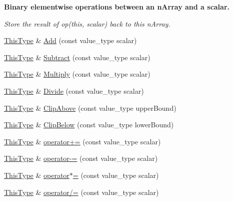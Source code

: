 \begin{Indent}{\bf Binary elementwise operations between an n\+Array and a scalar.}\par
{\em Store the result of op(this, scalar) back to this n\+Array. }\begin{DoxyCompactItemize}
\item 
\hyperlink{classvct_dynamic_const_n_array_base_a5123caffcf1455a1b99003877eade897}{This\+Type} \& \hyperlink{classvct_dynamic_n_array_base_af88d5b7c31a1d437dace088efb4a4381}{Add} (const value\+\_\+type scalar)
\item 
\hyperlink{classvct_dynamic_const_n_array_base_a5123caffcf1455a1b99003877eade897}{This\+Type} \& \hyperlink{classvct_dynamic_n_array_base_a6a5cf6ded7976f6d4fce24d6bea84232}{Subtract} (const value\+\_\+type scalar)
\item 
\hyperlink{classvct_dynamic_const_n_array_base_a5123caffcf1455a1b99003877eade897}{This\+Type} \& \hyperlink{classvct_dynamic_n_array_base_ac2cd87a03de241ea4dbc4047c84ec6b1}{Multiply} (const value\+\_\+type scalar)
\item 
\hyperlink{classvct_dynamic_const_n_array_base_a5123caffcf1455a1b99003877eade897}{This\+Type} \& \hyperlink{classvct_dynamic_n_array_base_a51a40fd2c5e4e979de62eb4dbbd3132e}{Divide} (const value\+\_\+type scalar)
\item 
\hyperlink{classvct_dynamic_const_n_array_base_a5123caffcf1455a1b99003877eade897}{This\+Type} \& \hyperlink{classvct_dynamic_n_array_base_ae0dea278c57e2543df8e7f25c8a2f3b7}{Clip\+Above} (const value\+\_\+type upper\+Bound)
\item 
\hyperlink{classvct_dynamic_const_n_array_base_a5123caffcf1455a1b99003877eade897}{This\+Type} \& \hyperlink{classvct_dynamic_n_array_base_aecd4a372764187d5eb95809c9b13082f}{Clip\+Below} (const value\+\_\+type lower\+Bound)
\item 
\hyperlink{classvct_dynamic_const_n_array_base_a5123caffcf1455a1b99003877eade897}{This\+Type} \& \hyperlink{classvct_dynamic_n_array_base_ae647bea07950c006fa6c485e8ddcc53d}{operator+=} (const value\+\_\+type scalar)
\item 
\hyperlink{classvct_dynamic_const_n_array_base_a5123caffcf1455a1b99003877eade897}{This\+Type} \& \hyperlink{classvct_dynamic_n_array_base_ad9af3a38ae067693ce2fd559d9ebdeae}{operator-\/=} (const value\+\_\+type scalar)
\item 
\hyperlink{classvct_dynamic_const_n_array_base_a5123caffcf1455a1b99003877eade897}{This\+Type} \& \hyperlink{classvct_dynamic_n_array_base_a40fad4a1b6bd4c1efd7af2e164ac2ad1}{operator$\ast$=} (const value\+\_\+type scalar)
\item 
\hyperlink{classvct_dynamic_const_n_array_base_a5123caffcf1455a1b99003877eade897}{This\+Type} \& \hyperlink{classvct_dynamic_n_array_base_af88c4fcd233a21e5daba0f5bbcde64be}{operator/=} (const value\+\_\+type scalar)
\end{DoxyCompactItemize}
\end{Indent}

